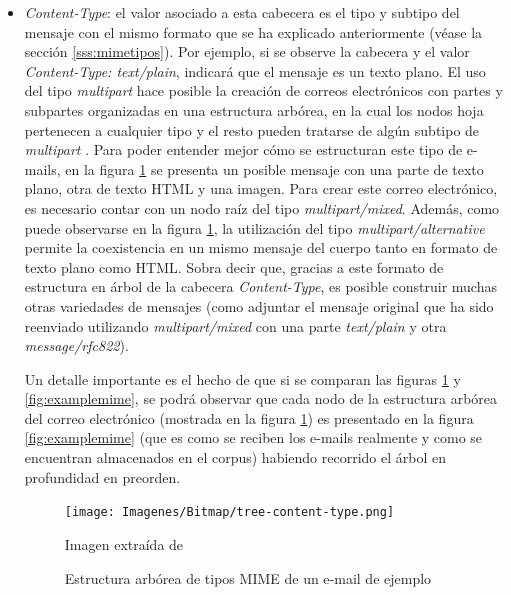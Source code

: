 \begin{itemize}
	\item \textit{Content-Type}: el valor asociado a esta cabecera es el tipo y subtipo del mensaje con el mismo formato que se ha explicado anteriormente (véase la sección \ref{sss:mimetipos}). Por ejemplo, si se observe la cabecera y el valor \textit{Content-Type: text/plain}, indicará que el mensaje es un texto plano. El uso del tipo \textit{multipart} hace posible la creación de correos electrónicos con partes y subpartes organizadas en una estructura arbórea, en la cual los nodos hoja pertenecen a cualquier tipo y el resto pueden tratarse de algún subtipo de \textit{multipart} \citep[Sección 7.2]{rfc1341}. Para poder entender mejor cómo se estructuran este tipo de e-mails, en la figura \ref{fig:content-type} se presenta un posible mensaje con una parte de texto plano, otra de texto HTML y una imagen. Para crear este correo electrónico, es necesario contar con un nodo raíz del tipo \textit{multipart/mixed}. Además, como puede observarse en la figura \ref{fig:content-type}, la utilización del tipo \textit{multipart/alternative} permite la coexistencia en un mismo mensaje del cuerpo tanto en formato de texto plano como HTML. Sobra decir que, gracias a este formato de estructura en árbol de la cabecera \textit{Content-Type}, es posible construir muchas otras variedades de mensajes (como adjuntar el mensaje original que ha sido reenviado utilizando \textit{multipart/mixed} con una parte \textit{text/plain} y otra \textit{message/rfc822}).
	
	Un detalle importante es el hecho de que si se comparan las figuras \ref{fig:content-type} y \ref{fig:examplemime}, se podrá observar que cada nodo de la estructura arbórea del correo electrónico (mostrada en la figura \ref{fig:content-type}) es presentado en la figura \ref{fig:examplemime} (que es como se reciben los e-mails realmente y como se encuentran almacenados en el corpus) habiendo recorrido el árbol en profundidad en preorden.
	
	\begin{figure}[t]
		\centering%
		\centerline{\texttt{[image: Imagenes/Bitmap/tree-content-type.png]}}%
		\caption{Estructura arbórea de tipos MIME de un e-mail de ejemplo}%
		\label{fig:content-type}
		Imagen extraída de \cite{mitfg}
	\end{figure}


\end{itemize}
